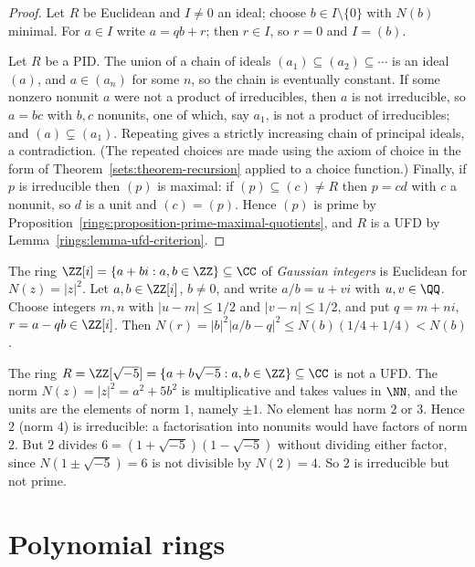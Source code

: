\begin{proof}
Let $R$ be Euclidean and $I \neq 0$ an ideal; choose $b \in I \setminus \{0\}$ with $N(b)$
minimal. For $a \in I$ write $a = qb + r$; then $r \in I$, so $r = 0$ and $I = (b)$.

Let $R$ be a PID. The union of a chain of ideals $(a_1) \subseteq (a_2) \subseteq \cdots$ is
an ideal $(a)$, and $a \in (a_n)$ for some $n$, so the chain is eventually constant.
If some nonzero nonunit $a$ were not a product of irreducibles, then $a$ is not
irreducible, so $a = bc$ with $b, c$ nonunits, one of which, say $a_1$, is not a
product of irreducibles; and $(a) \subsetneq (a_1)$. Repeating gives a strictly increasing
chain of principal ideals, a contradiction. (The repeated choices are made using
the axiom of choice in the form of Theorem~\ref{sets:theorem-recursion} applied to a
choice function.) Finally, if $p$ is irreducible then $(p)$ is maximal: if
$(p) \subseteq (c) \neq R$ then $p = cd$ with $c$ a nonunit, so $d$ is a unit and
$(c) = (p)$. Hence $(p)$ is prime by
Proposition~\ref{rings:proposition-prime-maximal-quotients}, and $R$ is a UFD by
Lemma~\ref{rings:lemma-ufd-criterion}.
\end{proof}

\begin{example}\label{rings:example-gaussian-integers}
The ring $\ZZ[i] = \{a + bi : a, b \in \ZZ\} \subseteq \CC$ of \emph{Gaussian integers} is
Euclidean for $N(z) = |z|^2$. Let $a, b \in \ZZ[i]$, $b \neq 0$, and write
$a/b = u + vi$ with $u, v \in \QQ$. Choose integers $m, n$ with $|u - m| \leq 1/2$ and
$|v - n| \leq 1/2$, and put $q = m + ni$, $r = a - qb \in \ZZ[i]$. Then
$N(r) = |b|^2 |a/b - q|^2 \leq N(b)(1/4 + 1/4) < N(b)$.
\end{example}

\begin{counterexample}\label{rings:counterexample-not-ufd}
The ring $R = \ZZ[\sqrt{-5}] = \{a + b\sqrt{-5} : a, b \in \ZZ\} \subseteq \CC$ is not a UFD. The
norm $N(z) = |z|^2 = a^2 + 5b^2$ is multiplicative and takes values in $\NN$, and the
units are the elements of norm $1$, namely $\pm 1$. No element has norm $2$ or $3$. Hence
$2$ (norm $4$) is irreducible: a factorisation into nonunits would have factors of
norm $2$. But $2$ divides $6 = (1 + \sqrt{-5})(1 - \sqrt{-5})$ without dividing either factor,
since $N(1 \pm \sqrt{-5}) = 6$ is not divisible by $N(2) = 4$. So $2$ is irreducible but not
prime.
\end{counterexample}

\section{Polynomial rings}\label{rings:section-polynomials}

